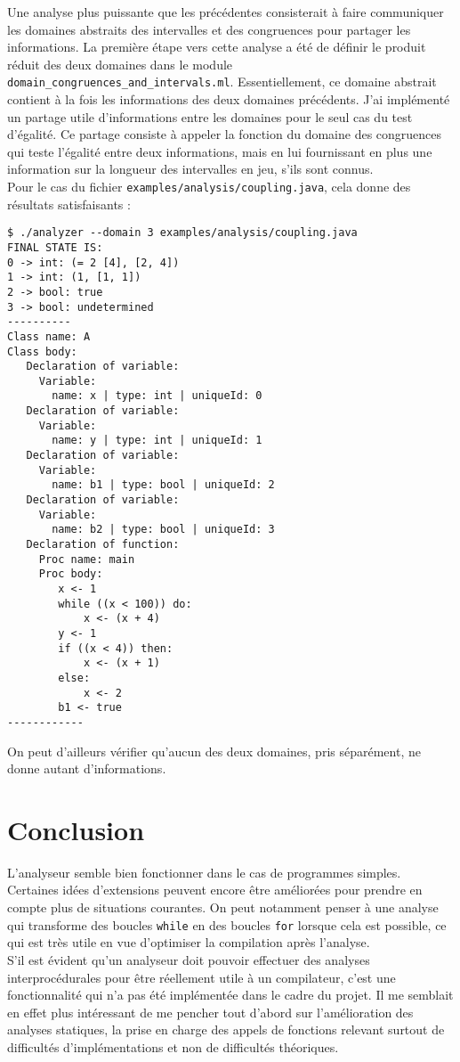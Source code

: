 \documentclass[paper=a4, fontsize=11pt]{scrartcl}
\numberwithin{figure}{section}			%
\numberwithin{table}{section}				%
\begin{document}
Une analyse plus puissante que les précédentes consisterait à faire communiquer les domaines abstraits des intervalles et des congruences pour partager les informations. La première étape vers cette analyse a été de définir le produit réduit des deux domaines dans le module \texttt{domain\_congruences\_and\_intervals.ml}. Essentiellement, ce domaine abstrait contient à la fois les informations des deux domaines précédents. J'ai implémenté un partage utile d'informations entre les domaines pour le seul cas du test d'égalité. Ce partage consiste à appeler la fonction du domaine des congruences qui teste l'égalité entre deux informations, mais en lui fournissant en plus une information sur la longueur des intervalles en jeu, s'ils sont connus.\\

Pour le cas du fichier \texttt{examples/analysis/coupling.java}, cela donne des résultats satisfaisants :

\begin{verbatim}
$ ./analyzer --domain 3 examples/analysis/coupling.java
FINAL STATE IS:
0 -> int: (= 2 [4], [2, 4])
1 -> int: (1, [1, 1])
2 -> bool: true
3 -> bool: undetermined
----------
Class name: A
Class body:
   Declaration of variable:
     Variable:
       name: x | type: int | uniqueId: 0
   Declaration of variable:
     Variable:
       name: y | type: int | uniqueId: 1
   Declaration of variable:
     Variable:
       name: b1 | type: bool | uniqueId: 2
   Declaration of variable:
     Variable:
       name: b2 | type: bool | uniqueId: 3
   Declaration of function:
     Proc name: main
     Proc body:
        x <- 1
        while ((x < 100)) do:
            x <- (x + 4)
        y <- 1
        if ((x < 4)) then:
            x <- (x + 1)
        else:
            x <- 2
        b1 <- true
------------
\end{verbatim}

On peut d'ailleurs vérifier qu'aucun des deux domaines, pris séparément, ne donne autant d'informations.

\section{Conclusion}

L'analyseur semble bien fonctionner dans le cas de programmes simples. Certaines idées d'extensions peuvent encore être améliorées pour prendre en compte plus de situations courantes. On peut notamment penser à une analyse qui transforme des boucles \texttt{while} en des boucles \texttt{for} lorsque cela est possible, ce qui est très utile en vue d'optimiser la compilation après l'analyse.\\

S'il est évident qu'un analyseur doit pouvoir effectuer des analyses interprocédurales pour être réellement utile à un compilateur, c'est une fonctionnalité qui n'a pas été implémentée dans le cadre du projet. Il me semblait en effet plus intéressant de me pencher tout d'abord sur l'amélioration des analyses statiques, la prise en charge des appels de fonctions relevant surtout de difficultés d'implémentations et non de difficultés théoriques.
\end{document}
